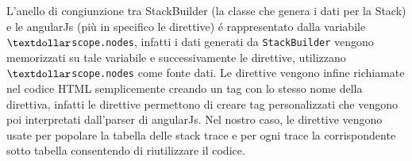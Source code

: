 L'anello di congiunzione tra StackBuilder (la classe che genera i dati per la Stack) e le angularJs (più in specifico le direttive) 
é rappresentato dalla variabile \texttt{$\textdollar$scope.nodes}, infatti i dati generati da \texttt{StackBuilder} vengono memorizzati su tale variabile e successivamente le direttive, utilizzano \texttt{$\textdollar$scope.nodes} come fonte dati. Le direttive vengono infine richiamate nel codice HTML semplicemente creando un 
tag con lo stesso nome della direttiva, infatti le direttive permettono di creare 
tag personalizzati che vengono poi interpretati dall'parser di angularJs. 
Nel nostro caso, le direttive vengono usate per popolare la tabella delle stack trace 
e per ogni trace la corrispondente sotto tabella consentendo di riutilizzare il codice.